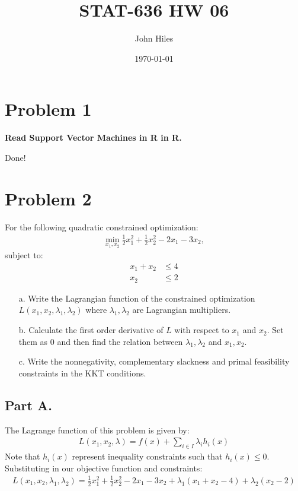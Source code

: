 \documentclass{article}
\title{STAT-636 HW 06}
\author{John Hiles}
\date\today
\begin{document}
\maketitle %


\section*{Problem 1}
\textbf{Read Support Vector Machines in R in R.}

Done!
\section*{Problem 2}
    For the following quadratic constrained optimization:
\begin{align*}
      \min_{x_1,x_2}\frac{1}{2}x_1^2 + \frac{1}{2}x_2^2 - 2x_1 -3x_2,
\end{align*}
    subject to:
\begin{align*}
      x_1 + x_ 2 &\leq 4\\
      x_2 &\leq 2
\end{align*}
\begin{enumerate}
    \item[a.]
      Write the Lagrangian function of the constrained optimization $L(x_1,x_2,\lambda_1,\lambda_2)$ where $\lambda_1,\lambda_2$ are Lagrangian multipliers.
    \item[b.]
      Calculate the first order derivative of $L$ with respect to $x_1$ and $x_2$. Set them as 0 and then find the relation between $\lambda_1, \lambda_2$ and $x_1,x_2$.
    \item[c.]
      Write the nonnegativity, complementary slackness and primal feasibility constraints in the KKT conditions.
    \end{enumerate}
\subsection*{Part A.}
The Lagrange function of this problem is given by:
\begin{align*}
L(x_1, x_2, \lambda) = f(x) + \sum_{i \in I} \lambda_i h_i(x)
\end{align*}
Note that $h_i(x)$ represent inequality constraints such that $h_i(x) \leq 0$. Substituting in our objective function and constraints:
\begin{align*}
\boxed{ L(x_1, x_2, \lambda_1, \lambda_2) = \frac{1}{2}x_1^2 + \frac{1}{2}x_2^2 - 2x_1 -3x_2 + \lambda_1(x_1+x_2-4)+ \lambda_2 (x_2-2) }
\end{align*}
\end{document}
